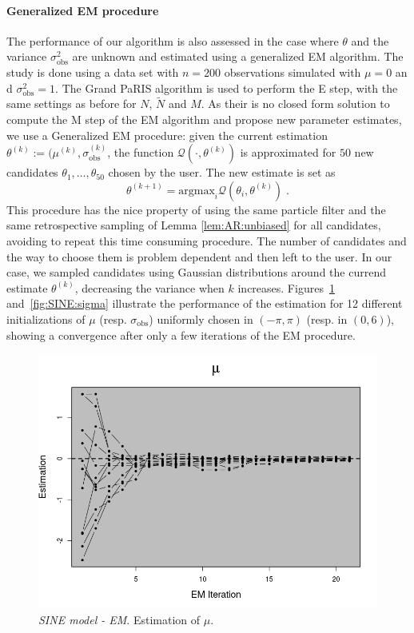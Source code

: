 \documentclass[12pt]{article}
\newcommand{\eqsp}{\;}
\newcommand{\1}{\mathrm{1}}
\begin{document}
\paragraph{Generalized EM procedure}
The performance of our algorithm is also assessed in the case where $\theta$ and the variance $\sigma^2_\text{obs}$ are unknown and estimated using a generalized EM algorithm. 
The study is done using a data set with $n = 200$ observations simulated with $\mu=0$ an d $ \sigma^2_\text{obs} = 1$. The Grand PaRIS algorithm is used to perform the E step, with the same settings as before for $N$, $\tilde{N}$ and $M$.
As their is no closed form solution to compute the M step of the EM algorithm and propose new parameter estimates, we use a Generalized EM procedure: given the current estimation $\theta^{(k)} := (\mu^{(k)}, \sigma_{\text{obs}}^{(k)}$, the function $\mathcal{Q}(\cdot, \theta^{(k)})$ is approximated for $50$ new candidates $\theta_1, \dots, \theta_{50} $ chosen by the user. The new estimate is set as
\[
\theta^{(k + 1)} = \text{argmax}_i\mathcal{Q}(\theta_i, \theta^{(k)})\eqsp .
\]
This procedure has the nice property of using the same particle filter and the same retrospective sampling of Lemma \ref{lem:AR:unbiased} for all candidates, avoiding to repeat this time consuming procedure. 
The number of candidates and the way to choose them is problem dependent and then left to the user. 
In our case, we sampled candidates using Gaussian distributions around the currend estimate $\theta^{(k)}$, decreasing the variance when $k$ increases.
Figures~\ref{fig:SINE:theta} and~\ref{fig:SINE:sigma} illustrate the performance of the estimation for 12 different initializations of $\mu$ (resp. $\sigma_\text{obs}$) uniformly chosen in  $(-\pi,\pi)$ (resp. in $(0,6)$), showing a convergence after only a few iterations of the EM procedure.

\begin{figure}[p]
\centering
\includegraphics[scale=0.5]{figure_theta}
\caption{{\em SINE model - EM}. Estimation  of $\mu$.}
\label{fig:SINE:theta}
\end{figure}
\end{document}
